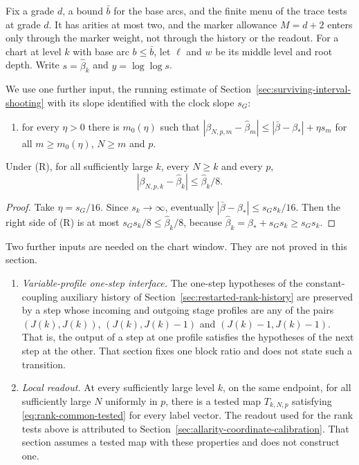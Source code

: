 Fix a grade $d$, a bound $\bar b$ for the base arcs, and the finite menu
of the trace tests at grade $d$. It has arities at most two, and the
marker allowance $M=d+2$ enters only through the marker weight, not
through the history or the readout. For a chart at level $k$ with base
arc $b\le\bar b$, let $\ell$ and $w$ be its middle level and root depth.
Write $s=\widehat\beta_k$ and $y=\log\log s$.

We use one further input, the running estimate of
Section~\ref{sec:surviving-interval-shooting} with its slope identified
with the clock slope $s_G$:
\begin{enumerate}
\item[(R)] for every $\eta>0$ there is $m_0(\eta)$ such that
 $|\beta_{N,p,m}-\widehat\beta_m|\le|\bar\beta-\beta_*|+\eta s_m$ for
 all $m\ge m_0(\eta)$, $N\ge m$ and $p$.
\end{enumerate}

\begin{lemma}
\label{lem:rank-trace-endpoint}
Under (R), for all sufficiently large $k$, every $N\ge k$ and every $p$,
\[
 |\beta_{N,p,k}-\widehat\beta_k|\le\widehat\beta_k/8 .
\]
\end{lemma}
\begin{proof}
Take $\eta=s_G/16$. Since $s_k\to\infty$, eventually
$|\bar\beta-\beta_*|\le s_Gs_k/16$. Then the right side of (R) is at
most $s_Gs_k/8\le\widehat\beta_k/8$, because
$\widehat\beta_k=\beta_*+s_Gs_k\ge s_Gs_k$.
\end{proof}

Two further inputs are needed on the chart window. They are not proved in
this section.
\begin{enumerate}
\item[(V)] \emph{Variable-profile one-step interface.} The one-step
 hypotheses of the constant-coupling auxiliary history of
 Section~\ref{sec:restarted-rank-history} are preserved by a step whose
 incoming and outgoing stage profiles are any of the pairs
 $(J(k),J(k))$, $(J(k),J(k)-1)$ and $(J(k)-1,J(k)-1)$. That is, the
 output of a step at one profile satisfies the hypotheses of the next
 step at the other. That section fixes one block ratio and does not state
 such a transition.
\item[(T)] \emph{Local readout.} At every sufficiently large level $k$,
 on the same endpoint, for all sufficiently large $N$ uniformly in $p$,
 there is a tested map $T_{k,N,p}$ satisfying
 \eqref{eq:rank-common-tested} for every label vector. The readout used
 for the rank tests above is attributed to
 Section~\ref{sec:allarity-coordinate-calibration}. That section assumes a
 tested map with these properties and does not construct one.
\end{enumerate}

